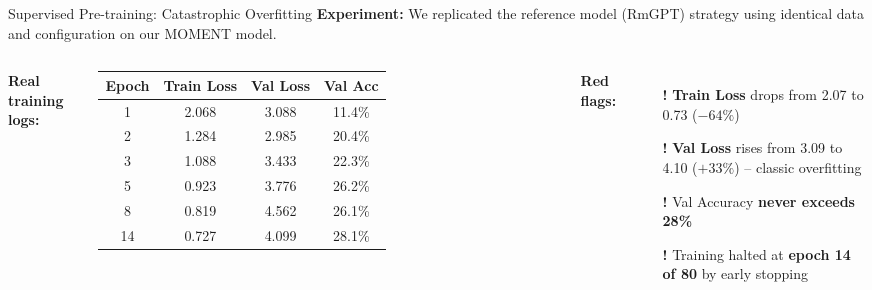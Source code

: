 \documentclass{beamer}
\begin{document}
\begin{frame}{Supervised Pre-training: Catastrophic Overfitting}
    \textbf{Experiment:} We replicated the reference model (RmGPT) strategy using identical data and configuration on our MOMENT model.

    \vspace{0.2cm}
    \begin{columns}
        \centering
        \textbf{Real training logs:}

        \begin{table}[]
            \scriptsize
            \begin{tabular}{@{}cccc@{}}
                \toprule
                \textbf{Epoch} & \textbf{Train Loss} & \textbf{Val Loss} & \textbf{Val Acc} \\ \midrule
                1  & 2.068 & \textcolor{mygreen}{3.088} & 11.4\% \\
                2  & 1.284 & \textcolor{mygreen}{2.985} & 20.4\% \\
                3  & 1.088 & \textcolor{myred}{3.433} & 22.3\% \\
                5  & 0.923 & \textcolor{myred}{3.776} & 26.2\% \\
                8  & 0.819 & \textcolor{myred}{4.562} & 26.1\% \\
                14 & 0.727 & \textcolor{myred}{4.099} & 28.1\% \\
                \bottomrule
            \end{tabular}
        \end{table}

        \textbf{Red flags:}
        \begin{itemize}
            \item[\textcolor{myred}{\textbf{!}}] \textbf{Train Loss} drops from 2.07 to 0.73 ($-64\%$)
            \item[\textcolor{myred}{\textbf{!}}] \textbf{Val Loss} rises from 3.09 to 4.10 ($+33\%$) -- classic overfitting
            \item[\textcolor{myred}{\textbf{!}}] Val Accuracy \textbf{never exceeds 28\%}
            \item[\textcolor{myred}{\textbf{!}}] Training halted at \textbf{epoch 14 of 80} by early stopping
        \end{itemize}
    \end{columns}
\end{frame}
\end{document}
